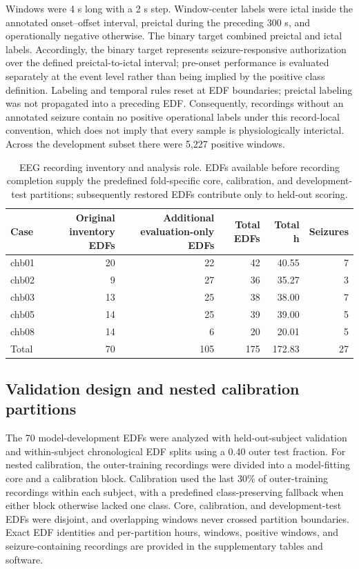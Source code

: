 \documentclass[11pt,a4paper]{article}
\begin{document}
Windows were 4 s long with a 2 s step. Window-center labels were ictal inside the annotated onset--offset interval, preictal during the preceding 300 s, and operationally negative otherwise. The binary target combined preictal and ictal labels. Accordingly, the binary target represents seizure-responsive authorization over the defined preictal-to-ictal interval; pre-onset performance is evaluated separately at the event level rather than being implied by the positive class definition. Labeling and temporal rules reset at EDF boundaries; preictal labeling was not propagated into a preceding EDF. Consequently, recordings without an annotated seizure contain no positive operational labels under this record-local convention, which does not imply that every sample is physiologically interictal. Across the development subset there were 5,227 positive windows.

\begin{table}[htbp]
\centering
\caption{EEG recording inventory and analysis role. EDFs available before recording completion supply the predefined fold-specific core, calibration, and development-test partitions; subsequently restored EDFs contribute only to held-out scoring.}
\label{tab:dataset}
\small
\setlength{\tabcolsep}{4pt}
\renewcommand{\arraystretch}{1.15}
\begin{tabular}{@{}lrrrrr@{}}
\toprule
Case & Original inventory EDFs & Additional evaluation-only EDFs & Total EDFs & Total h & Seizures \\
\midrule
chb01 & 20 & 22 & 42 & 40.55 & 7 \\
chb02 & 9 & 27 & 36 & 35.27 & 3 \\
chb03 & 13 & 25 & 38 & 38.00 & 7 \\
chb05 & 14 & 25 & 39 & 39.00 & 5 \\
chb08 & 14 & 6 & 20 & 20.01 & 5 \\
\midrule
Total & 70 & 105 & 175 & 172.83 & 27 \\
\bottomrule
\end{tabular}
\end{table}

\subsection{Validation design and nested calibration partitions}
\label{sec:partitions}
The 70 model-development EDFs were analyzed with held-out-subject validation and within-subject chronological EDF splits using a 0.40 outer test fraction. For nested calibration, the outer-training recordings were divided into a model-fitting core and a calibration block. Calibration used the last 30\% of outer-training recordings within each subject, with a predefined class-preserving fallback when either block otherwise lacked one class. Core, calibration, and development-test EDFs were disjoint, and overlapping windows never crossed partition boundaries. Exact EDF identities and per-partition hours, windows, positive windows, and seizure-containing recordings are provided in the supplementary tables and software.
\end{document}
